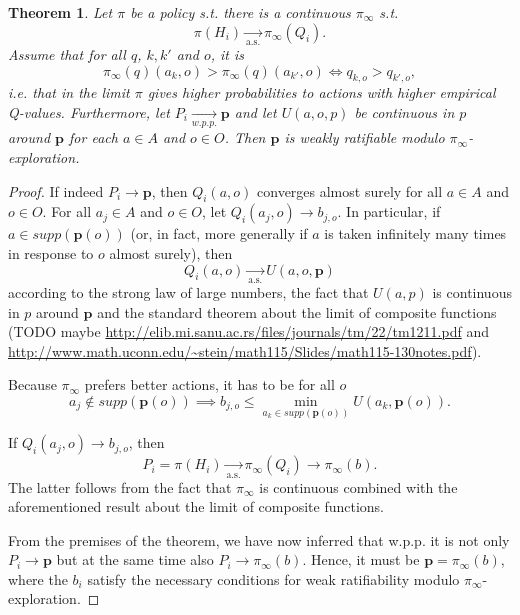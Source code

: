 \documentclass{article}
\newtheorem{thm}{Theorem} %
\begin{document}
\begin{thm}\label{theorem:weak-ratifiability-modulo-exploration}
Let $\pi$ be a policy s.t. there is a continuous $\pi_\infty$ s.t.
\begin{equation}
\pi (H_i)\underset{\text{a.s.}}{\rightarrow} \pi_\infty (Q_i).
\end{equation}
Assume that for all $q$, $k,k'$ and $o$, it is
\begin{equation}
\pi_\infty(q)(a_k,o) > \pi_\infty(q)(a_{k'},o) \iff q_{k,o} > q_{k',o},
\end{equation}
i.e. that in the limit $\pi$ gives higher probabilities to actions with higher empirical Q-values. Furthermore, let $P_i \underset{w.p.p.}{\rightarrow} \mathbf{p}$ and let $U(a,o,p)$ be continuous in $p$ around $\mathbf{p}$ for each $a\in A$ and $o\in O$. Then $\mathbf{p}$ is weakly ratifiable modulo $\pi_\infty$-exploration.
\end{thm}

\begin{proof}
If indeed $P_i \rightarrow \mathbf{p}$, then $Q_i(a,o)$ converges almost surely for all $a\in A$ and $o\in O$. For all $a_j\in A$ and $o\in O$, let $Q_i(a_j,o) \rightarrow b_{j,o}$. In particular, if $a\in supp(\mathbf{p}(o))$ (or, in fact, more generally if $a$ is taken infinitely many times in response to $o$ almost surely), then
\begin{equation}
Q_i(a,o)\underset{\text{a.s.}}{\rightarrow} U(a,o,\mathbf{p})
\end{equation}
according to the strong law of large numbers, the fact that $U(a,p)$ is continuous in $p$ around $\mathbf{p}$ and the standard theorem about the limit of composite functions (TODO maybe \url{http://elib.mi.sanu.ac.rs/files/journals/tm/22/tm1211.pdf} and \url{http://www.math.uconn.edu/~stein/math115/Slides/math115-130notes.pdf}).

Because $\pi_\infty$ prefers better actions, it has to be for all $o$
\begin{equation}
a_j\notin supp(\mathbf{p}(o)) \implies b_{j,o} \leq \min_{a_k\in supp (\mathbf{p}(o)) } U(a_k,\mathbf{p}(o)).
\end{equation}

If $Q_i(a_j,o)\rightarrow b_{j,o}$, then
\begin{equation}
P_i=\pi(H_i)\underset{\text{a.s.}}{\rightarrow} \pi_\infty(Q_i)\rightarrow \pi_\infty (b).
\end{equation}
The latter follows from the fact that $\pi_\infty$ is continuous combined with the aforementioned result about the limit of composite functions.

From the premises of the theorem, we have now inferred that w.p.p. it is not only $P_i\rightarrow \mathbf{p}$ but at the same time also $P_i\rightarrow \pi_\infty (b)$. Hence, it must be $\mathbf{p}=\pi_\infty(b)$, where the $b_i$ satisfy the necessary conditions for weak ratifiability modulo $\pi_\infty$-exploration.


\end{proof}
\end{document}

